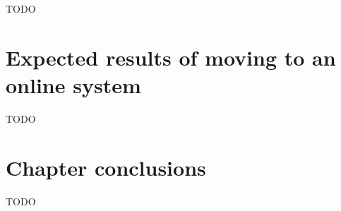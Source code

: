 TODO

\section{Expected results of moving to an online system}
\label{sec:evaluation_online}


TODO

\section{Chapter conclusions}
\label{sec:evaluation_conclusions}

TODO
